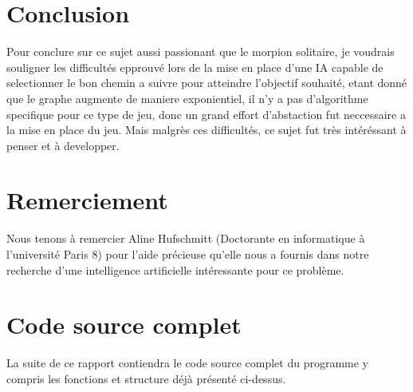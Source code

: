 \documentclass[11pt]{article}
\begin{document}
		
		\section{Conclusion}
		Pour conclure sur ce sujet aussi passionant que le morpion solitaire, je voudrais souligner les difficultés epprouvé lors de la mise en place d'une IA capable de selectionner le bon chemin a suivre pour atteindre l'objectif souhaité, etant donné que le graphe augmente de maniere exponientiel, il n'y a pas d'algorithme specifique pour ce type de jeu, donc un grand effort d'abstaction fut neccessaire a la mise en place du jeu. Mais malgrès ces difficultés, ce sujet fut très intéréssant à penser et à developper.
		
\section{Remerciement}
Nous tenons à remercier Aline Hufschmitt (Doctorante en informatique à l'université Paris 8) pour l'aide précieuse qu'elle nous a fournis dans notre recherche d'une intelligence artificielle intéressante pour ce problème.

\section{Code source complet}
La suite de ce rapport contiendra le code source complet du programme y compris les fonctions et structure déjà présenté ci-dessus.
\end{document}
